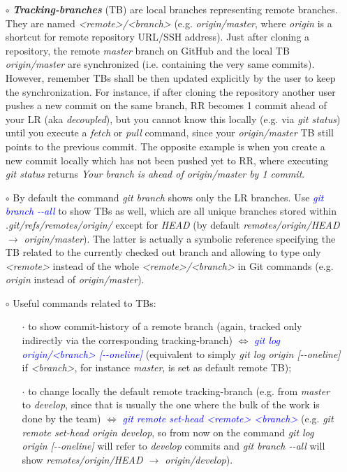 \documentclass[a4paper,portrait,10pt]{article}   %
\newcommand{\mydiv}{$\Leftrightarrow$ }   %
\newcommand{\mycmd}[1]{\textcolor{blue}{\textit{#1}}}   %
\newcommand{\myvspace}{\vspace{4mm}}   %
\begin{document}
\begin{itemize}
\item[$\circ$] \textbf{\textit{Tracking-branches}} (TB) are local branches representing remote branches. They are named \textit{<remote>/<branch>} (e.g. \textit{origin/master}, where \textit{origin} is a shortcut for remote repository URL/SSH address). Just after cloning a repository, the remote \textit{master} branch on GitHub and the local TB \textit{origin/master} are synchronized (i.e. containing the very same commits). However, remember TBs shall be then updated explicitly by the user to keep the synchronization. For instance, if after cloning the repository another user pushes a new commit on the same branch, RR becomes 1 commit ahead of your LR (aka \textit{decoupled}), but you cannot know this locally (e.g. via \textit{git status}) until you execute a \textit{fetch} or \textit{pull} command, since your \textit{origin/master} TB still points to the previous commit. The opposite example is when you create a new commit locally which has not been pushed yet to RR, where executing \textit{git status} returns \textit{Your branch is ahead of origin/master by 1 commit}.
\myvspace

\item[$\circ$] By default the command \textit{git branch} shows only the LR branches. Use \mycmd{git branch -{}-all} to show TBs as well, which are all unique branches stored within \textit{.git/refs/remotes/origin/} except for \textit{HEAD} (by default \textit{remotes/origin/HEAD $\rightarrow$ origin/master}). The latter is actually a symbolic reference specifying the TB related to the currently checked out branch and allowing to type only \textit{<remote>} instead of the whole \textit{<remote>/<branch>} in Git commands (e.g. \textit{origin} instead of \textit{origin/master}).
\myvspace

\item[$\circ$] Useful commands related to TBs:
\begin{itemize}
  \item[$\cdot$] to show commit-history of a remote branch (again, tracked only indirectly via the corresponding tracking-branch) \mydiv \mycmd{git log origin/<branch> [-{}-oneline]} (equivalent to simply \textit{git log origin [-{}-oneline]} if \textit{<branch>}, for instance \textit{master}, is set as default remote TB);
  \item[$\cdot$] to change locally the default remote tracking-branch (e.g. from \textit{master} to \textit{develop}, since that is usually the one where the bulk of the work is done by the team) \mydiv \mycmd{git remote set-head <remote> <branch>} (e.g. \textit{git remote set-head origin develop}, so from now on the command \textit{git log origin [-{}-oneline]} will refer to \textit{develop} commits and \textit{git branch -{}-all} will show \textit{remotes/origin/HEAD $\rightarrow$ origin/develop}).
\end{itemize}
\myvspace


\end{itemize}
\end{document}
